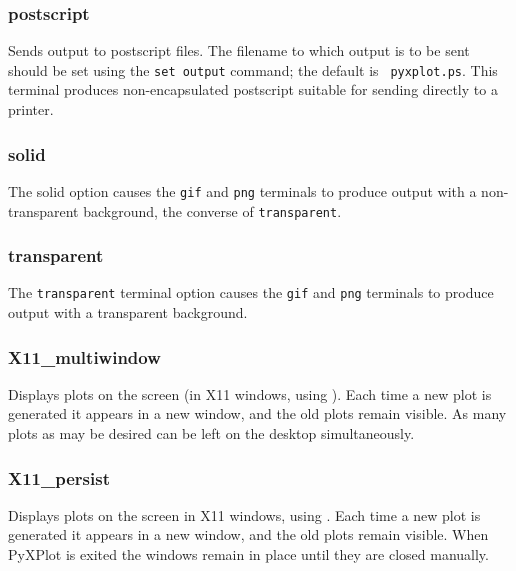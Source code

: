 \subsubsection{postscript}

Sends output to postscript files. The filename to which output is to be sent
should be set using the {\tt set output} command; the default is {\tt
pyxplot.ps}.  This terminal produces non-encapsulated postscript suitable for
sending directly to a printer.

\subsubsection{solid}

The solid option causes the {\tt gif} and {\tt png} terminals to produce output
with a non-transparent background, the converse of {\tt transparent}.


\subsubsection{transparent}

The {\tt transparent} terminal option causes the {\tt gif} and {\tt png}
terminals to produce output with a transparent background.


\subsubsection{X11\_multiwindow}

Displays plots on the screen (in X11 windows, using \ghostview). Each time a new
plot is generated it appears in a new window, and the old plots remain visible.
As many plots as may be desired can be left on the desktop simultaneously.

\subsubsection{X11\_persist}

Displays plots on the screen in X11 windows, using \ghostview.  Each time a new
plot is generated it appears in a new window, and the old plots remain visible.
When PyXPlot is exited the windows remain in place until they are closed
manually.

